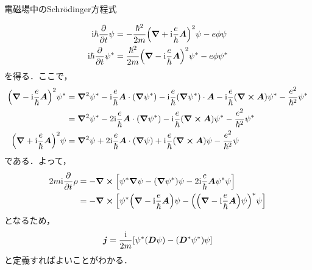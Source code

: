 \documentclass{report}
\begin{document}
\begin{myexc}{電磁場中のSchrödinger方程式}{}
\begin{enumerate}
        \begin{align}
          \mathrm{i}\hbar \pdv{t} \psi &= -\frac{\hbar^2}{2m}\qty(\grad + \mathrm{i}\frac{e}{\hbar}\bm{A})^2\psi - e\phi\psi\\
          \mathrm{i}\hbar \pdv{t} \psi^{*} &= \frac{\hbar^2}{2m}\qty(\grad - \mathrm{i}\frac{e}{\hbar}\bm{A})^2\psi^{*} - e\phi\psi^{*}
        \end{align}
        を得る．ここで，
        \begin{align}
          \qty(\grad - \mathrm{i}\frac{e}{\hbar}\bm{A})^2\psi^{*} &= \grad^2\psi^{*} - \mathrm{i}\frac{e}{\hbar}\bm{A}\cdot(\grad{\psi^{*}}) - \mathrm{i}\frac{e}{\hbar}(\grad\psi^{*})\cdot\bm{A} - \mathrm{i}\frac{e}{\hbar}(\curl\bm{A})\psi^{*} - \frac{e^2}{\hbar^2}\psi^{*}\\
          &= \grad^2\psi^{*} - 2\mathrm{i}\frac{e}{\hbar}\bm{A}\cdot(\grad\psi^{*}) - \mathrm{i}\frac{e}{\hbar}(\curl\bm{A})\psi^{*} - \frac{e^2}{\hbar^2}\psi^{*}\\
          \qty(\grad + \mathrm{i}\frac{e}{\hbar}\bm{A})^2\psi &= \grad^2\psi + 2\mathrm{i}\frac{e}{\hbar}\bm{A}\cdot(\grad \psi) + \mathrm{i}\frac{e}{\hbar}(\curl\bm{A})\psi - \frac{e^2}{\hbar^2}\psi
        \end{align}
        である．よって，
        \begin{align}
          2m\mathrm{i}\pdv{t}\rho &= -\curl\qty[\psi^{*}\grad\psi - (\grad\psi^{*})\psi - 2\mathrm{i} \frac{e}{\hbar}\bm{A}\psi^{*}\psi]\\
          &= -\curl\qty[\psi^{*}\qty(\grad - \mathrm{i}\frac{e}{\hbar} \bm{A})\psi - \qty(\qty(\grad - \mathrm{i} \frac{e}{\hbar}\bm{A})\psi)^{*}\psi]
        \end{align}
        となるため，
        \begin{align}
          \bm{j} = \frac{\mathrm{i}}{2m}\qty[\psi^{*}(\bm{D}\psi) - (\bm{D}^{*}\psi^{*})\psi]
        \end{align}
        と定義すればよいことがわかる．
    \end{enumerate}
  \end{myexc}
\end{document}
